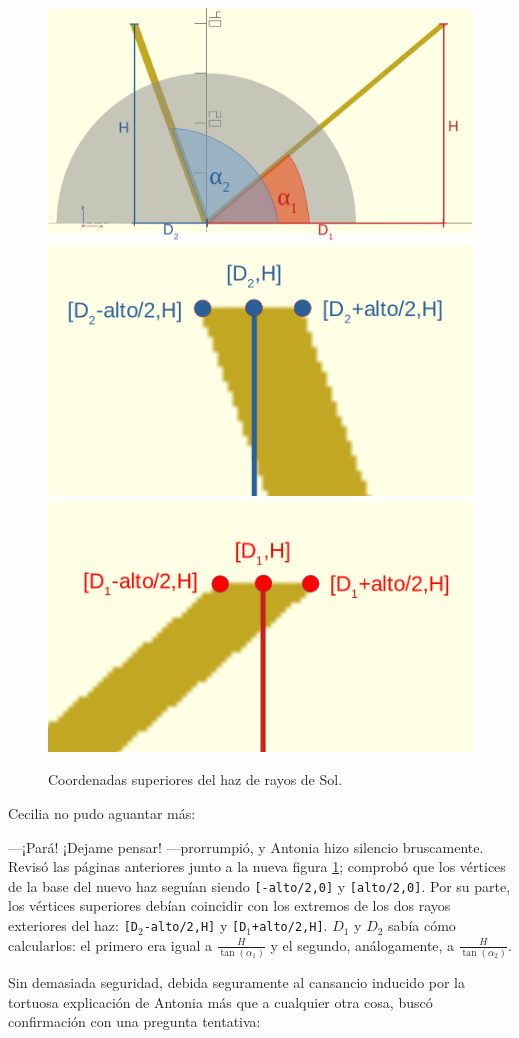 \begin{figure}[ht]
  \centering
  \includegraphics[width=.6\textwidth]{imagenes/dos-rayos-anotados}
  \includegraphics[width=.49\textwidth]{imagenes/haz-alfa2}\hfill
  \includegraphics[width=.49\textwidth]{imagenes/haz-alfa1}  
  \caption{Coordenadas superiores del haz de rayos de Sol.}
  \label{fig:dos-rayos-anotados}
\end{figure}

Cecilia no pudo aguantar más:

---¡Pará! ¡Dejame pensar!  ---prorrumpió, y Antonia hizo silencio
bruscamente. Revisó las páginas anteriores junto a la nueva figura
\ref{fig:dos-rayos-anotados}; comprobó que los vértices de la base del
nuevo haz seguían siendo \texttt{[-alto/2,0]} y
\texttt{[alto/2,0]}. Por su parte, los vértices superiores debían
coincidir con los extremos de los dos rayos exteriores del haz:
\texttt{[D$_2$-alto/2,H]} y \texttt{[D$_1$+alto/2,H]}. $D_1$ y $D_2$
sabía cómo calcularlos: el primero era igual a
$\frac{H}{\tan (\alpha_1)}$ y el segundo, análogamente, a
$\frac{H}{\tan (\alpha_2)}$.

Sin demasiada seguridad, debida seguramente al cansancio inducido por
la tortuosa explicación de Antonia más que a cualquier otra cosa,
buscó confirmación con una pregunta tentativa:

